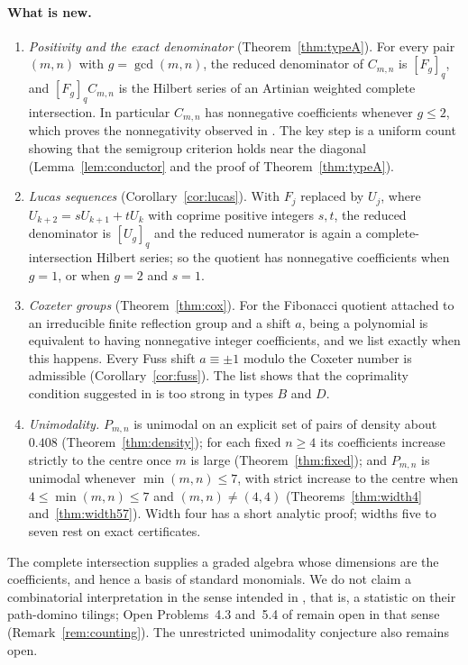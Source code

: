 \documentclass[11pt,a4paper]{article}
\theoremstyle{definition}\newtheorem{definition}[theorem]{Definition}
\theoremstyle{remark}\newtheorem{remark}[theorem]{Remark}\newtheorem{example}[theorem]{Example}
\numberwithin{equation}{section}
\begin{document}
\paragraph{What is new.}
\begin{enumerate}
\item \emph{Positivity and the exact denominator} (Theorem~\ref{thm:typeA}). For every pair $(m,n)$ with $g=\gcd(m,n)$, the reduced denominator of $C_{m,n}$ is $[F_g]_q$, and $[F_g]_qC_{m,n}$ is the Hilbert series of an Artinian weighted complete intersection. In particular $C_{m,n}$ has nonnegative coefficients whenever $g\le2$, which proves the nonnegativity observed in \cite{bck}. The key step is a uniform count showing that the semigroup criterion holds near the diagonal (Lemma~\ref{lem:conductor} and the proof of Theorem~\ref{thm:typeA}).
\item \emph{Lucas sequences} (Corollary~\ref{cor:lucas}). With $F_j$ replaced by $U_j$, where $U_{k+2}=sU_{k+1}+tU_k$ with coprime positive integers $s,t$, the reduced denominator is $[U_g]_q$ and the reduced numerator is again a complete-intersection Hilbert series; so the quotient has nonnegative coefficients when $g=1$, or when $g=2$ and $s=1$.
\item \emph{Coxeter groups} (Theorem~\ref{thm:cox}). For the Fibonacci quotient attached to an irreducible finite reflection group and a shift $a$, being a polynomial is equivalent to having nonnegative integer coefficients, and we list exactly when this happens. Every Fuss shift $a\equiv\pm1$ modulo the Coxeter number is admissible (Corollary~\ref{cor:fuss}). The list shows that the coprimality condition suggested in \cite[Remark~4.5]{bck} is too strong in types $B$ and $D$.
\item \emph{Unimodality.} $P_{m,n}$ is unimodal on an explicit set of pairs of density about $0.408$ (Theorem~\ref{thm:density}); for each fixed $n\ge4$ its coefficients increase strictly to the centre once $m$ is large (Theorem~\ref{thm:fixed}); and $P_{m,n}$ is unimodal whenever $\min(m,n)\le7$, with strict increase to the centre when $4\le\min(m,n)\le7$ and $(m,n)\ne(4,4)$ (Theorems~\ref{thm:width4} and~\ref{thm:width57}). Width four has a short analytic proof; widths five to seven rest on exact certificates.
\end{enumerate}
The complete intersection supplies a graded algebra whose dimensions are the coefficients, and hence a basis of standard monomials. We do not claim a combinatorial interpretation in the sense intended in \cite{bck}, that is, a statistic on their path-domino tilings; Open Problems~4.3 and~5.4 of \cite{bck} remain open in that sense (Remark~\ref{rem:counting}). The unrestricted unimodality conjecture also remains open.
\end{document}
